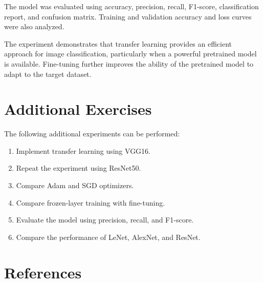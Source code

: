 \documentclass[12pt,a4paper]{article}
\begin{document}
The model was evaluated using accuracy, precision, recall, F1-score, classification report, and confusion matrix. Training and validation accuracy and loss curves were also analyzed.

The experiment demonstrates that transfer learning provides an efficient approach for image classification, particularly when a powerful pretrained model is available. Fine-tuning further improves the ability of the pretrained model to adapt to the target dataset.


\section{Additional Exercises}

The following additional experiments can be performed:

\begin{enumerate}
    \item Implement transfer learning using VGG16.
    \item Repeat the experiment using ResNet50.
    \item Compare Adam and SGD optimizers.
    \item Compare frozen-layer training with fine-tuning.
    \item Evaluate the model using precision, recall, and F1-score.
    \item Compare the performance of LeNet, AlexNet, and ResNet.
\end{enumerate}


\section{References}
\end{document}
